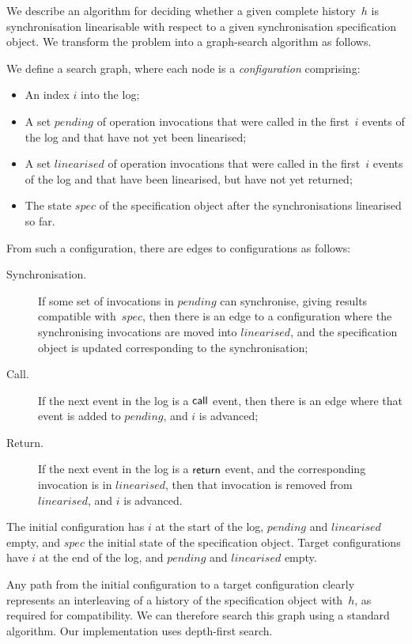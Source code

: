 We describe an algorithm for deciding whether a given complete history~$h$ is
synchronisation linearisable with respect to a given synchronisation
specification object.  We transform the problem into a graph-search algorithm
as follows.

We define a search graph, where each node is a \emph{configuration}
comprising:
%
\begin{itemize}
\item An index $i$ into the log;

\item A set $pending$ of operation invocations that were called in the
  first~$i$ events of the log and that have not yet been linearised;

\item A set $linearised$ of operation invocations that were called in the
  first~$i$ events of the log and that have been linearised, but have not yet
  returned;

\item The state $spec$ of the specification object after the synchronisations
  linearised so far.
\end{itemize}
%
From such a configuration, there are edges to configurations as follows:
%
\begin{description}
\item[Synchronisation.] If some set of invocations in $pending$ can
  synchronise, giving results compatible with~$spec$, then there is an edge to
  a configuration where the synchronising invocations are moved into
  $linearised$, and the specification object is updated corresponding to the
  synchronisation;

\item[Call.] If the next event in the log is a $\mathsf{call}$ event, then there is an
  edge where that event is added to $pending$, and $i$ is advanced;

\item[Return.] If the next event in the log is a $\mathsf{return}$ event, and the
  corresponding invocation is in $linearised$, then that invocation is removed
  from $linearised$, and $i$ is advanced.
\end{description}
%
The initial configuration has $i$ at the start of the log, $pending$ and
$linearised$ empty, and $spec$ the initial state of the specification object.
Target configurations have $i$ at the end of the log, and $pending$ and
$linearised$ empty.  

Any path from the initial configuration to a target configuration clearly
represents an interleaving of a history of the specification object with~$h$,
as required for compatibility.  We can therefore search this graph using a
standard algorithm.  Our implementation uses depth-first search.


